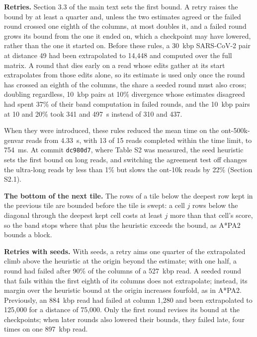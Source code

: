 \documentclass[10pt]{article}
\begin{document}
\textbf{Retries.} Section 3.3 of the main text sets the first bound. A retry raises the bound by at least a quarter and, unless the two estimates agreed or the failed round crossed one eighth of the columns, at most doubles it, and a failed round grows its bound from the one it ended on, which a checkpoint may have lowered, rather than the one it started on. Before these rules, a 30~kbp SARS-CoV-2 pair at distance 49 had been extrapolated to 14{,}448 and computed over the full matrix. A round that dies early on a read whose edits gather at its start extrapolates from those edits alone, so its estimate is used only once the round has crossed an eighth of the columns, the share a seeded round must also cross; doubling regardless, 10~kbp pairs at 10\% divergence whose estimates disagreed had spent 37\% of their band computation in failed rounds, and the 10~kbp pairs at 10 and 20\% took 341 and 497~\textmu s instead of 310 and 437.

When they were introduced, these rules reduced the mean time on the ont-500k-genvar reads from 4.33~s, with 13 of 15 reads completed within the time limit, to 754~ms. At commit \texttt{dc980d7}, where Table S2 was measured, the seed heuristic sets the first bound on long reads, and switching the agreement test off changes the ultra-long reads by less than 1\% but slows the ont-10k reads by 22\% (Section S2.1).

\textbf{The bottom of the next tile.} The rows of a tile below the deepest row kept in the previous tile are bounded before the tile is swept: a cell \(j\) rows below the diagonal through the deepest kept cell costs at least \(j\) more than that cell's score, so the band stops where that plus the heuristic exceeds the bound, as A*PA2 bounds a block.

\textbf{Retries with seeds.} With seeds, a retry aims one quarter of the extrapolated climb above the heuristic at the origin beyond the estimate; with one half, a round had failed after 90\% of the columns of a 527~kbp read. A seeded round that fails within the first eighth of its columns does not extrapolate; instead, its margin over the heuristic bound at the origin increases fourfold, as in A*PA2. Previously, an 884~kbp read had failed at column 1{,}280 and been extrapolated to 125{,}000 for a distance of 75{,}000. Only the first round revises its bound at the checkpoints; when later rounds also lowered their bounds, they failed late, four times on one 897~kbp read.
\end{document}
